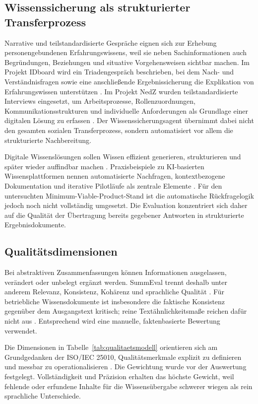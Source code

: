 \documentclass[
  10pt,
  ngerman,
  a4paper,
  toc=graduated,
  numbers=noenddot,
  headings=standardclasses
]{scrartcl}
\begin{document}
\subsection{Wissenssicherung als strukturierter Transferprozess}

Narrative und teilstandardisierte Gespräche eignen sich zur Erhebung personengebundenen Erfahrungswissens, weil sie neben Sachinformationen auch Begründungen, Beziehungen und situative Vorgehensweisen sichtbar machen. Im Projekt IDboard wird ein Triadengespräch beschrieben, bei dem Nach- und Verständnisfragen sowie eine anschließende Ergebnissicherung die Explikation von Erfahrungswissen unterstützen \cite[S.~132--136]{sander_onboarding_2023}. Im Projekt NedZ wurden teilstandardisierte Interviews eingesetzt, um Arbeitsprozesse, Rollenzuordnungen, Kommunikationsstrukturen und individuelle Anforderungen als Grundlage einer digitalen Lösung zu erfassen \cite[S.~10--11]{boehme_nedz_2023}. Der Wissenssicherungsagent übernimmt dabei nicht den gesamten sozialen Transferprozess, sondern automatisiert vor allem die strukturierte Nachbereitung.

Digitale Wissenslösungen sollen Wissen effizient generieren, strukturieren und später wieder auffindbar machen \cite[S.~429--440]{schweiger_serwiss_2023}. Praxisbeispiele zu KI-basierten Wissensplattformen nennen automatisierte Nachfragen, kontextbezogene Dokumentation und iterative Pilotläufe als zentrale Elemente \cite[S.~129--141]{volkens_wissensmanagement_2026}. Für den untersuchten Minimum-Viable-Product-Stand ist die automatische Rückfragelogik jedoch noch nicht vollständig umgesetzt. Die Evaluation konzentriert sich daher auf die Qualität der Übertragung bereits gegebener Antworten in strukturierte Ergebnisdokumente.

\subsection{Qualitätsdimensionen}

Bei abstraktiven Zusammenfassungen können Informationen ausgelassen, verändert oder unbelegt ergänzt werden. SummEval trennt deshalb unter anderem Relevanz, Konsistenz, Kohärenz und sprachliche Qualität \cite{fabbri2021}. Für betriebliche Wissensdokumente ist insbesondere die faktische Konsistenz gegenüber dem Ausgangstext kritisch; reine Textähnlichkeitsmaße reichen dafür nicht aus \cite{kryscinski2020}. Entsprechend wird eine manuelle, faktenbasierte Bewertung verwendet.

Die Dimensionen in Tabelle~\ref{tab:qualitaetsmodell} orientieren sich am Grundgedanken der ISO/IEC 25010, Qualitätsmerkmale explizit zu definieren und messbar zu operationalisieren \cite{iso25010}. Die Gewichtung wurde vor der Auswertung festgelegt. Vollständigkeit und Präzision erhalten das höchste Gewicht, weil fehlende oder erfundene Inhalte für die Wissensübergabe schwerer wiegen als rein sprachliche Unterschiede.
\end{document}
